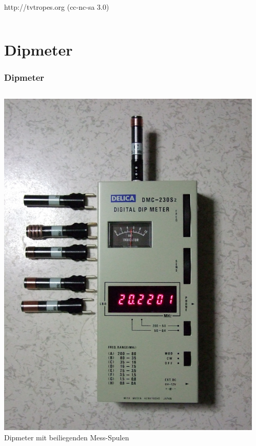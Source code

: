 \begin{frame}
\begin{columns}
\begin{flushright}
      {\tiny http://tvtropes.org (cc-nc-sa 3.0)}
    \end{flushright}
  \end{columns}
\end{frame}

\section*{Dipmeter}

\begin{frame}
  \frametitle{Dipmeter}
  \begin{columns}
    \begin{center}
      \includegraphics[width=\textwidth,height=.8\textheight,keepaspectratio]{a16/Dipmeter.jpg}\\
      {\tiny Dipmeter mit beiliegenden Mess-Spulen \href{refs}{\cite{wmen}}}
    \end{center}
    \begin{itemize}

\end{itemize}
\end{columns}
\end{frame}
